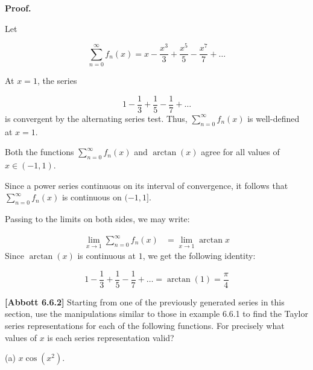 \documentclass[10pt]{article}
\begin{document}
\textbf{Proof.}



Let


\begin{equation*}
\sum _{n=0}^{\infty } f_{n}( x) =x-\frac{x^{3}}{3} +\frac{x^{5}}{5} -\frac{x^{7}}{7} +\dotsc 
\end{equation*}


At $\displaystyle x=1$, the series


\begin{equation*}
1-\frac{1}{3} +\frac{1}{5} -\frac{1}{7} +\dotsc 
\end{equation*}
is convergent by the alternating series test. Thus, $\displaystyle \sum _{n=0}^{\infty } f_{n}( x)$ is well-defined at $\displaystyle x=1$.

Both the functions $\displaystyle \sum _{n=0}^{\infty } f_{n}( x)$ and $\displaystyle \arctan( x)$ agree for all values of $\displaystyle x\in ( -1,1)$. 

Since a power series continuous on its interval of convergence, it follows that $\displaystyle \sum _{n=0}^{\infty } f_{n}( x)$ is continuous on $\displaystyle ( -1,1]$. 





Passing to the limits on both sides, we may write:


\begin{equation*}
\begin{aligned}
\lim _{x\rightarrow 1}\sum _{n=0}^{\infty } f_{n}( x) & =\lim _{x\rightarrow 1}\arctan x
\end{aligned}
\end{equation*}
Since $\displaystyle \arctan( x)$ is continuous at $\displaystyle 1$, we get the following identity:


\begin{equation*}
1-\frac{1}{3} +\frac{1}{5} -\frac{1}{7} +\dotsc =\arctan( 1) =\frac{\pi }{4}
\end{equation*}


\textbf{[Abbott 6.6.2]} Starting from one of the previously generated series in this section, use the manipulations similar to those in example 6.6.1 to find the Taylor series representations for each of the following functions. For precisely what values of $\displaystyle x$ is each series representation valid?



(a) $\displaystyle x\cos\left( x^{2}\right)$.
\end{document}
